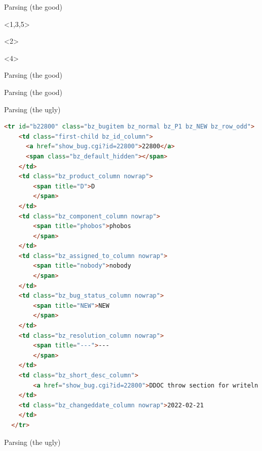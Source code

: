\documentclass[aspectratio=169,notes]{beamer}
\begin{document}
	\begin{frame}[fragile]{Parsing (the good)}
		\begin{onlyenv}<1,3,5>
			
		\end{onlyenv}
		\begin{onlyenv}<2>
			
		\end{onlyenv}
		\begin{onlyenv}<4>
			
		\end{onlyenv}
	\end{frame}
	\begin{frame}[fragile]{Parsing (the good)}
		
	\end{frame}
	\begin{frame}[fragile]{Parsing (the good)}
		
	\end{frame}
	\begin{frame}[fragile]{Parsing (the ugly)}
		\begin{lstlisting}[language=html,basicstyle=\tiny\ttfamily]
  <tr id="b22800" class="bz_bugitem bz_normal bz_P1 bz_NEW bz_row_odd">
    <td class="first-child bz_id_column">
      <a href="show_bug.cgi?id=22800">22800</a>
      <span class="bz_default_hidden"></span>
    </td>
    <td class="bz_product_column nowrap">
        <span title="D">D
        </span>
    </td>
    <td class="bz_component_column nowrap">
        <span title="phobos">phobos
        </span>
    </td>
    <td class="bz_assigned_to_column nowrap">
        <span title="nobody">nobody
        </span>
    </td>
    <td class="bz_bug_status_column nowrap">
        <span title="NEW">NEW
        </span>
    </td>
    <td class="bz_resolution_column nowrap">
        <span title="---">---
        </span>
    </td>
    <td class="bz_short_desc_column">
        <a href="show_bug.cgi?id=22800">DDOC throw section for writeln is incomplete        </a>
    </td>
    <td class="bz_changeddate_column nowrap">2022-02-21
    </td>
  </tr>
		\end{lstlisting}
	\end{frame}
	\begin{frame}[fragile]{Parsing (the ugly)}
		
	\end{frame}
\end{document}
